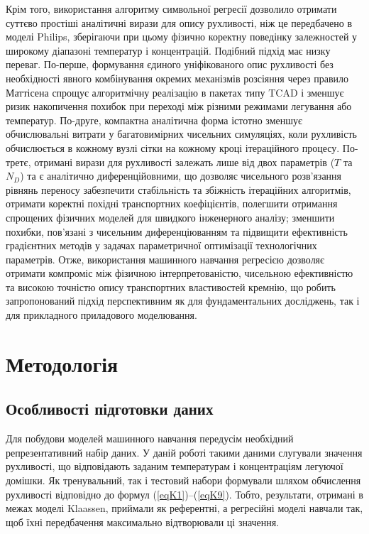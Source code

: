 \documentclass[fleqn,twoside,twocolumn,nofootinbib,showkeys]{revtex4} %
\begin{document}
Крім того, використання алгоритму символьної регресії дозволило отримати суттєво простіші аналітичні вирази для опису рухливості,
ніж це передбачено в моделі Philips, зберігаючи при цьому фізично коректну поведінку залежностей у широкому діапазоні температур і концентрацій.
Подібний підхід має низку переваг.
По-перше, формування єдиного уніфікованого опис рухливості без необхідності явного комбінування окремих механізмів розсіяння через правило Маттісена
спрощує алгоритмічну реалізацію в пакетах типу TCAD і зменшує ризик накопичення похибок при переході між різними режимами легування або температур.
По-друге, компактна аналітична форма істотно зменшує обчислювальні витрати у багатовимірних чисельних симуляціях,
коли рухливість обчислюється в кожному вузлі сітки на кожному кроці ітераційного процесу.
По-третє, отримані вирази для рухливості залежать лише від двох параметрів ($T$ та $N_D$) та є аналітично диференційовними,
що дозволяє чисельного розв'язання рівнянь переносу забезпечити стабільність та збіжність ітераційних алгоритмів,
отримати коректні похідні транспортних коефіцієнтів,
полегшити отримання спрощених фізичних моделей для швидкого інженерного аналізу;
зменшити похибки, пов’язані з чисельним диференціюванням та підвищити ефективність градієнтних методів
у задачах параметричної оптимізації технологічних параметрів.
Отже, використання машинного навчання регресією дозволяє отримати компроміс між фізичною інтерпретованістю,
чисельною ефективністю та високою точністю опису транспортних властивостей кремнію,
що робить запропонований підхід перспективним як для фундаментальних досліджень, так і для прикладного приладового моделювання.

\section{Методологія}

\subsection{Особливості підготовки даних}

Для побудови моделей машинного навчання передусім необхідний репрезентативний набір даних.
У даній роботі такими даними слугували значення рухливості,
що відповідають заданим температурам і концентраціям легуючої домішки.
Як тренувальний, так і тестовий набори формували шляхом обчислення рухливості відповідно до формул (\ref{eqK1})–(\ref{eqK9}).
Тобто, результати, отримані в межах моделі Klaassen, приймали як референтні,
а регресійні моделі навчали так, щоб їхні передбачення максимально відтворювали ці значення.
\end{document}
